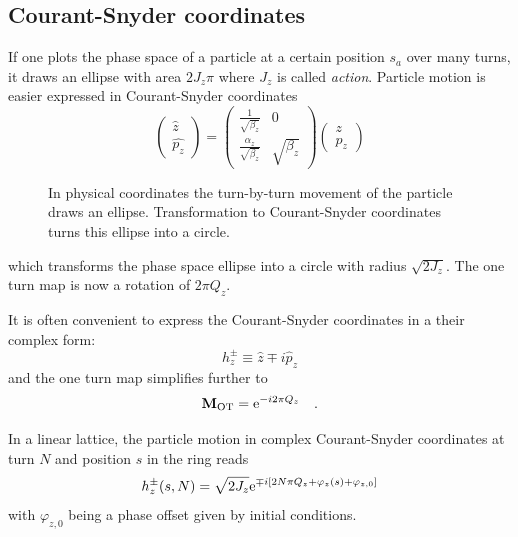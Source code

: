 \subsection{Courant-Snyder coordinates}
If one plots the phase space of a particle at a certain position $s_a$ over many turns, it draws an
ellipse with area $2J_z\pi$ where $J_z$ is called \emph{action}.
Particle motion is easier expressed in Courant-Snyder coordinates
%
\begin{equation}
    \begin{pmatrix}
        \hat{z}\\
        \hat{p_z}
    \end{pmatrix}
    =
    \begin{pmatrix}
        \frac{1}{\sqrt{\beta_z}} & 0\\
        \frac{\alpha_z}{\sqrt{\beta_z}} & \sqrt{\beta_z}
    \end{pmatrix}
    \begin{pmatrix}
        z\\
        p_z
    \end{pmatrix}
    \label{eq_cs_matrix}
\end{equation}
%
\begin{figure}[h]
    \centering
    
    \hspace{1em}
    
    \caption{In physical coordinates the turn-by-turn movement of the particle draws an ellipse.
        Transformation to Courant-Snyder
        coordinates turns this ellipse into a circle.}
    \label{fig_phase_space_ellipse}
\end{figure}
%
which transforms the phase space ellipse into a circle with radius $\sqrt{2J_z}$.
The one turn map is now a rotation of $2\pi Q_z$. 

It is often convenient to express the Courant-Snyder coordinates in a their complex form:
%
\begin{equation}
    h^\pm_z \equiv \hat{z} \mp i \hat{p}_z
    \label{eq_courantsnyder}
\end{equation}
%
and the one turn map simplifies further to
%
\begin{equation}
    \mathbf{M}_\text{OT} = \text{e}^{-i2\pi Q_z}
    \quad .
\end{equation}

In a linear lattice, the particle motion in complex Courant-Snyder coordinates at turn $N$ and position
$s$ in the ring reads
%
\begin{equation}
    h_z^\pm(s,N) = \sqrt{2J_z} \text{e}^{\mp i \left[2N\pi Q_z + \varphi_z(s) + \varphi_{z,0}\right]}
\end{equation}
%
with $\varphi_{z,0}$ being a phase offset given by initial conditions.

